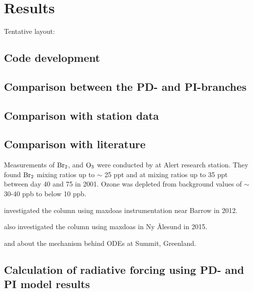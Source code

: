 \setcounter{chapter}{5}
\chapter{Results}

Tentative layout: 


\section{Code development}







\section{Comparison between the PD- and PI-branches}

\section{Comparison with station data}

\section{Comparison with literature}

Measurements of $\mathrm{Br_2}$,  and $\mathrm{O_3}$ were conducted by \cite{Foster2001} at Alert research station. They found $\mathrm{Br_2}$ mixing ratios up to $\sim$ 25 \acrshort{ppt} and  at mixing ratios up to 35 \acrshort{ppt} between day 40 and 75 in 2001. Ozone was depleted from background values of $\sim$ 30-40 \acrshort{ppb} to below 10 ppb. 

\medskip

\cite{Simpson2017} investigated the  column using \acrlong{maxdoas} instrumentation near Barrow in 2012.

\medskip

\cite{Luo2018} also investigated the  column using \acrshort{maxdoas} in Ny Ålesund in 2015. 

\medskip

\cite{Thomas2012} and \cite{Thomas2011} about the mechanism behind ODEs at Summit, Greenland. 

\section{Calculation of radiative forcing using PD- and PI model results}